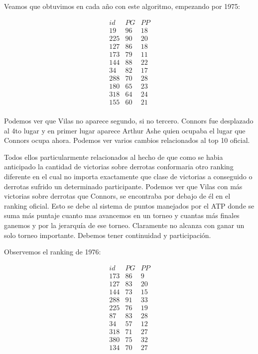 Veamos que obtuvimos en cada año con este algoritmo, empezando por 1975:

\begin{eqnarray*}
id & PG & PP \\
19 & 96 & 18 \\
225 & 90  & 20 \\
127 & 86 & 18 \\
173 & 79 & 11 \\
144 & 88 & 22 \\
34 & 82 & 17 \\
288 & 70 & 28 \\
180 & 65 & 23 \\
318 & 64 & 24 \\
155 & 60 & 21 \\
\end{eqnarray*}

Podemos ver que Vilas no aparece segundo, si no tercero. Connors fue desplazado al 4to lugar y en primer lugar aparece Arthur Ashe quien ocupaba el lugar que Connors ocupa ahora. Podemos ver varios cambios relacionados al top 10 oficial. 

Todos ellos particularmente relacionados al hecho de que como se habia anticipado la cantidad de victorias sobre derrotas conformaria otro ranking diferente en el cual no importa exactamente que clase de victorias a conseguido o derrotas sufrido un determinado participante. Podemos ver que Vilas con más victorias sobre derrotas que Connors, se encontraba por debajo de él en el ranking oficial. Esto se debe al sistema de puntos manejados por el ATP donde se suma más puntaje cuanto mas avancemos en un torneo y cuantas más finales ganemos y por la jerarquía de ese torneo. Claramente no alcanza con ganar un solo torneo importante. Debemos tener continuidad y participación.

Observemos el ranking de 1976:

\begin{eqnarray*}
id & PG & PP \\
173 & 86 & 9 \\
127 & 83 & 20 \\
144 & 73 & 15 \\
288 & 91 & 33 \\
225 & 76 & 19 \\
87 & 83 & 28 \\
34 & 57 & 12 \\
318 & 71 & 27 \\
380 & 75 & 32 \\
134 & 70 & 27 \\
\end{eqnarray*}

